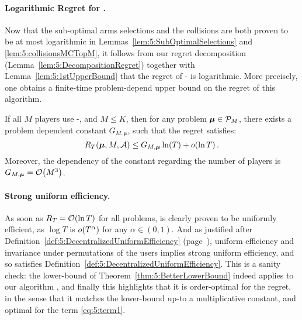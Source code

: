 \paragraph{Logarithmic Regret for \MCTopM.}
%
Now that the sub-optimal arms selections and the collisions
are both proven to be at most logarithmic in Lemmas~\ref{lem:5:SubOptimalSelections} and \ref{lem:5:collisionsMCTopM},
it follows from our regret decomposition (Lemma~\ref{lem:5:DecompositionRegret}) together with Lemma~\ref{lem:5:1stUpperBound} that the regret of \MCTopM-\klUCB{} is logarithmic. More precisely, one obtains a finite-time problem-depend upper bound on the regret of this algorithm.

\begin{theorem}\label{thm:5:LogarithmicRegret_MCTopMklUCB}
\begin{leftbar}[theorembar]  %
  If all $M$ players use
  \MCTopM-\klUCB, and $M \leq K$,
  then for any problem $\boldsymbol{\mu} \in \mathcal{P}_M$,
  there exists a problem dependent constant $G_{M,\boldsymbol{\mu}}$, such that
  the regret satisfies:
  \begin{equation}\label{eq:5:LogarithmicRegret_MCTopMklUCB}
    R_T(\boldsymbol{\mu}, M, \mathcal{A}) \leq G_{M,\boldsymbol{\mu}} \ln(T) + \mathop{}\mathopen{}o\mathopen{}\left(\ln T\right).
  \end{equation}
  Moreover, the dependency of the constant regarding the number of players is $G_{M,\boldsymbol{\mu}} = \mathop{}\mathopen{}\mathcal{O}\mathopen{}\left(M^3\right)$.
\end{leftbar}  %
\end{theorem}




\paragraph{Strong uniform efficiency.}\label{app:5:JustifyingDefinition5}
%
As soon as $R_T = \mathop{}\mathopen{}\mathcal{O}\mathopen{}\left(\ln T\right)$ for all problems, \MCTopM{} is clearly proven
to be uniformly efficient, as $\log T$ is $\mathop{}\mathopen{}o\mathopen{}\left(T^{\alpha}\right)$ for any $\alpha\in(0,1)$.
%
And as justified after Definition~\ref{def:5:DecentralizedUniformEfficiency} (page~\pageref{def:5:DecentralizedUniformEfficiency}), uniform efficiency and invariance under permutations of the users implies strong uniform efficiency, and so \MCTopM{} satisfies Definition~\ref{def:5:DecentralizedUniformEfficiency}.
%
This is a sanity check: the lower-bound of
Theorem~\ref{thm:5:BetterLowerBound} indeed applies to our algorithm \MCTopM,
and finally this highlights that it is order-optimal for the regret, in the sense that it matches the lower-bound up-to a multiplicative constant,
and optimal for the term \ref{eq:5:term1}.


